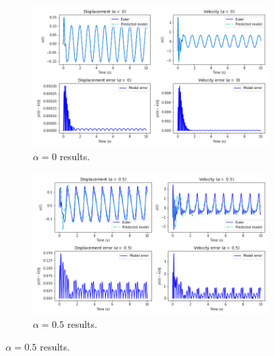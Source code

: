 \documentclass{article}
\begin{document}
\begin{figure}[!htb]
     \centering
     \begin{subfigure}[b]{0.49\textwidth}
         \centering
         \includegraphics[width=\textwidth]{Q4c_fig2.png}
         \caption{$\alpha=0$ results.}
     \end{subfigure}
     \hfill
     \begin{subfigure}[b]{0.49\textwidth}
         \centering
         \includegraphics[width=\textwidth]{Q4c_fig4.png}
         \caption{$\alpha=0.5$ results.}
     \end{subfigure}
     

\end{figure}
\end{document}
